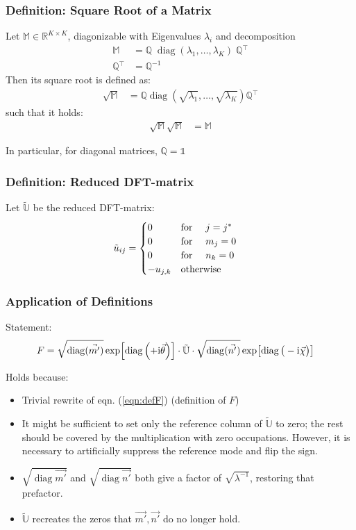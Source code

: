 \documentclass[
	english,
	a4paper,
	fontsize=10pt,
	parskip=half,
	titlepage=true,
	DIV=12,
	final
]{scrreprt}
\newcommand*{\transp}{\ensuremath{^\intercal}}
\newcommand*{\iunit}{\ensuremath{\mathrm{i}}}
\newcommand*{\setReals}    {\ensuremath{\mathbb{R}}}
\DeclareMathOperator{\diag}{diag}
\begin{document}
\subsubsection{Definition: Square Root of a Matrix}
Let $\mathbb{M} \in \setReals^{K \times K}$, diagonizable with Eigenvalues $\lambda_i$ and decomposition
\begin{align}
	\mathbb{M}
&=
	\mathbb{Q} \; \diag(\lambda_1, \ldots, \lambda_K) \; \mathbb{Q}\transp 
\\
	\mathbb{Q}\transp
&=
	\mathbb{Q}^{-1}
\end{align}
Then its square root is defined as:
\begin{align}
	\sqrt{\mathbb{M}}
&=
	\mathbb{Q} \diag(\sqrt{\lambda_1}, \ldots, \sqrt{\lambda_K}) \mathbb{Q}\transp 
\end{align}
such that it holds:
\begin{align}
	\sqrt{\mathbb{M}}  \sqrt{\mathbb{M}} &= \mathbb{M}
\end{align}

In particular, for diagonal matrices, $\mathbb{Q} = \mathds{1}$

\subsubsection{Definition: Reduced DFT-matrix}
Let $\tilde{\mathbb{U}}$ be the reduced DFT-matrix:
\begin{align}
	\tilde{u}_{ij}
&=
	\begin{cases}
		0			&\qq*{for } j = j^* \\
		0			&\qq*{for } m_j = 0 \\
		0			&\qq*{for } n_k = 0 \\
		-u_{j,k}		&\qotherwise*
	\end{cases}
\end{align}

\subsubsection{Application of Definitions}
Statement:
\begin{align}
	F
&=
		\sqrt{\diag(\vec{m'})}
		\exp [\diag\qty(+\iunit\vec{\theta})]
	\cdot
		\tilde{\mathbb{U}}
	\cdot
		\sqrt{\diag(\vec{n'})}
		\exp [\diag\qty(\big. -\iunit\vec{\chi})]
\end{align}

Holds because:
\begin{itemize}
\item Trivial rewrite of eqn. (\ref{eqn:defF}) (definition of $F$)
\item {\color{red} It might be sufficient to set only the reference column of $\tilde{\mathbb{U}}$ to zero; the rest should be covered by the multiplication with zero occupations. However, it is necessary to artificially suppress the reference mode and flip the sign.}
\item $\sqrt{\diag{\vec{m'}}}$ and $\sqrt{\diag{\vec{n'}}}$ both give a factor of $\sqrt{\lambda^{-1}}$, restoring that prefactor.
\item $\tilde{\mathbb{U}}$ recreates the zeros that $\vec{m'}, \vec{n'}$ do no longer hold.
\end{itemize}
\end{document}

